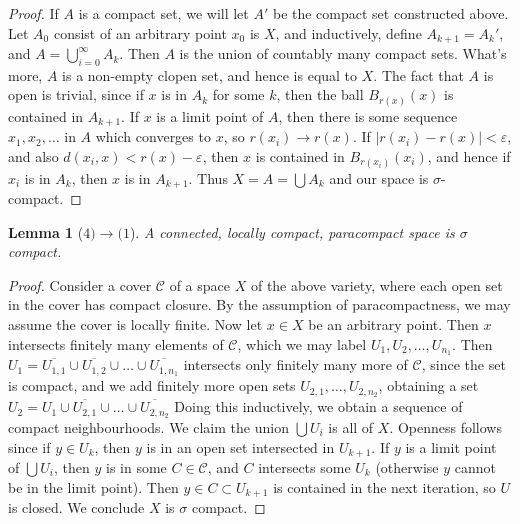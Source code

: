 \documentclass[12pt]{report}
\theoremstyle{plain}
\newtheorem{lemma}[theorem]{Lemma}
\theoremstyle{definition}
\begin{document}
\begin{proof}
    If $A$ is a compact set, we will let $A'$ be the compact set constructed above. Let $A_0$ consist of an arbitrary point $x_0$ is $X$, and inductively, define $A_{k+1} = A_k'$, and $A = \bigcup_{i = 0}^\infty A_k$. Then $A$ is the union of countably many compact sets. What's more, $A$ is a non-empty clopen set, and hence is equal to $X$. The fact that $A$ is open is trivial, since if $x$ is in $A_k$ for some $k$, then the ball $B_{r(x)}(x)$ is contained in $A_{k+1}$. If $x$ is a limit point of $A$, then there is some sequence $x_1, x_2, \dots$ in $A$ which converges to $x$, so $r(x_i) \to r(x)$. If $|r(x_i) - r(x)| < \varepsilon$, and also $d(x_i,x) < r(x) - \varepsilon$, then $x$ is contained in $B_{r(x_i)}(x_i)$, and hence if $x_i$ is in $A_k$, then $x$ is in $A_{k+1}$. Thus $X = A = \bigcup A_k$ and our space is $\sigma$-compact.
\end{proof}

\begin{lemma}[$4) \to (1$]
    A connected, locally compact, paracompact space is $\sigma$ compact.
\end{lemma}
\begin{proof}
    Consider a cover $\mathcal{C}$ of a space $X$ of the above variety, where each open set in the cover has compact closure. By the assumption of paracompactness, we may assume the cover is locally finite. Now let $x \in X$ be an arbitrary point. Then $x$ intersects finitely many elements of $\mathcal{C}$, which we may label $U_1, U_2, \dots, U_{n_1}$. Then $U_1 = \overline{U_{1,1}} \cup \overline{U_{1,2}} \cup \dots \cup \overline{U_{{1,n_1}}}$ intersects only finitely many more of $\mathcal{C}$, since the set is compact, and we add finitely more open sets $U_{2,1}, \dots, U_{2,n_2}$, obtaining a set $U_2 = U_1 \cup \overline{U_{2,1}} \cup \dots \cup \overline{U_{2,n_2}}$ Doing this inductively, we obtain a sequence of compact neighbourhoods. We claim the union $\bigcup U_i$ is all of $X$. Openness follows since if $y \in U_k$, then $y$ is in an open set intersected in $U_{k+1}$. If $y$ is a limit point of $\bigcup U_i$, then $y$ is in some $C \in \mathcal{C}$, and $C$ intersects some $U_k$ (otherwise $y$ cannot be in the limit point). Then $y \in C \subset U_{k+1}$ is contained in the next iteration, so $U$ is closed. We conclude $X$ is $\sigma$ compact.
\end{proof}
\end{document}
